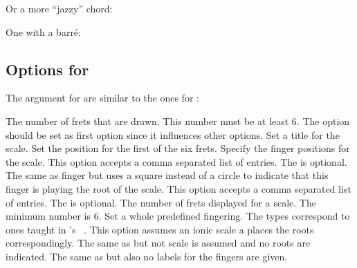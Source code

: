\documentclass[load-preamble+]{cnltx-doc}
\begin{document}
Or a more "`jazzy"' chord:
\begin{example}
  \chordscheme[
    name      = G\textsuperscript{6} ,
    position  = II ,
    finger    = {1/4:1, 3/3:4, 2/2:3} ,
    root      = 2/6:2 ,
    show-root = 4/4 ,
    mute      = {1,5}
  ]
\end{example}

One with a barr\'e:

\begin{example}
  \chordscheme[
    name      = Gmi\textsuperscript{7} ,
    position  = II ,
    barre     = 2/2-4:3 ,
    show-root = 4/4 ,
    root      = 2/6:2 ,
    mute      = {1,5}
  ]
\end{example}

\subsection{Options for }
The  argument for  are similar to the ones for
:
\begin{options}
    The number of frets that are drawn.  This number must be
    at least 6.  The option should be set as first option since it influences
    other options.
    Set a title for the scale.
    Set the position for the first of the six frets.
    Specify the finger positions for the scale.  This option accepts a comma
    separated list of entries.  The  is optional.
    The same as finger but uses a square instead of a circle to indicate that
    this finger is playing the root of the scale.  This option accepts a comma
    separated list of entries.  The  is optional.
    The number of frets displayed for a scale.  The minimum number is 6.
    Set a whole predefined fingering.  The types correspond to ones taught
    in \citeauthor{leavitt:mmfg:1}'s
    ~\cite{leavitt:mmfg:1}.  This option assumes an
    ionic scale a places the roots correspondingly.
    The same as  but not scale is assumed and no roots are
    indicated.
    The same as  but also no labels for the fingers are given.
\end{options}
\end{document}
